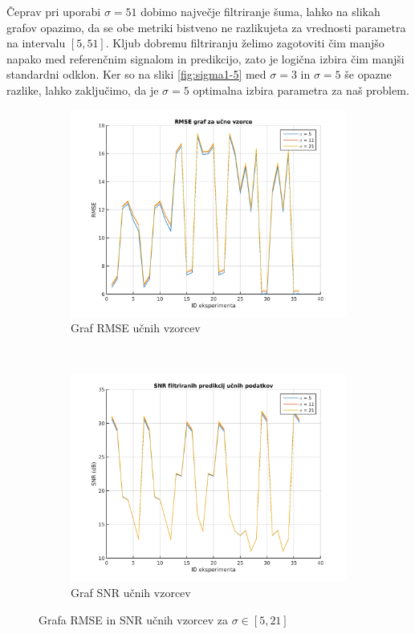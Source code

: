 Čeprav pri uporabi $\sigma=51$ dobimo največje filtriranje šuma, lahko na slikah grafov opazimo, da se obe metriki bistveno ne razlikujeta za vrednosti parametra na intervalu $[5,51]$. Kljub dobremu filtriranju želimo zagotoviti čim manjšo napako med referenčnim signalom in predikcijo, zato je logična izbira čim manjši standardni odklon. Ker so na sliki \ref{fig:sigma1-5} med $\sigma=3$ in $\sigma=5$ še opazne razlike, lahko zaključimo, da je $\sigma=5$ optimalna izbira parametra za naš problem. 


\begin{figure}[htb]
	\centering
	\begin{subfigure}[t]{0.45\columnwidth}
		\includegraphics[width=\columnwidth]{./Slike/sigma-rmse5-21.png}
		\caption{Graf RMSE  učnih vzorcev}
		\label{fig:sigma-rmse5-21}
	\end{subfigure}
	~
	\begin{subfigure}[t]{0.45\columnwidth}
		\includegraphics[width=\columnwidth]{./Slike/sigma-snr5-21.png}
		\caption{Graf SNR  učnih vzorcev}
		\label{fig:sigma-snr5-21}
	\end{subfigure}
	\caption{Grafa RMSE in SNR učnih vzorcev za \mbox{$\sigma \in [5,21]$}}
	\label{fig:sigma5-21}
\end{figure}



